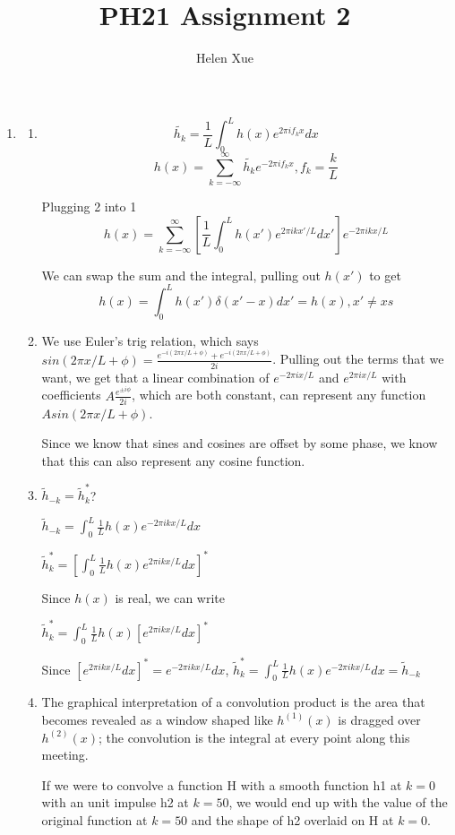 \documentclass[a4paper,11pt,english]{article}
\title{PH21 Assignment 2}
\author{Helen Xue}
\begin{document}
\maketitle

\begin{enumerate}
	\item 
	\begin{enumerate}
		\item $$\widetilde{h_k} = \frac{1}{L} \int_{0}^{L} h(x)e^{2\pi if_kx}dx$$ $$h(x) = \sum_{k=-\infty}^{\infty} \widetilde{h_k}e^{-2 \pi i f_kx}, f_k = \frac{k}{L}$$
		\par Plugging 2 into 1 
		$$h(x) = \sum_{k=-\infty}^{\infty} [ \frac{1}{L}\int_{0}^{L}h(x')e^{2\pi ikx'/L}dx']e^{-2 \pi i k x/L}$$
		\par We can swap the sum and the integral, pulling out $h(x')$ to get
		$$ h(x) = \int_0^L h(x') \delta(x'-x)dx' = h(x), x' \neq xs$$
		
		\item We use Euler's trig relation, which says $sin(2\pi x/L + \phi) = \frac{e^{-i(2\pi x/L + \phi)}+ e^{-i(2\pi x/L + \phi)}}{2i}$. Pulling out the terms that we want, we get that a linear combination of $e^{-2\pi i x/L}$ and $e^{2\pi i x/L}$ with coefficients $A\frac{e^{\pm i\phi}}{2i}$, which are both constant, can represent any function $Asin(2\pi x/L + \phi)$.
		
		 Since we know that sines and cosines are offset by some phase, we know that this can also represent any cosine function.
		
		\item $\widetilde h_{-k} = \widetilde h_k^*$?
		
		\par $\widetilde h_{-k} = \int_0^L \frac{1}{L} h(x)e^{-2\pi i kx/L}dx $  
		\par $\widetilde h_k^* = [\int_0^L \frac{1}{L} h(x)e^{2\pi i kx/L}dx ]^*$
		\par Since $h(x)$ is real, we can write
		\par $\widetilde h_k^* = \int_0^L \frac{1}{L} h(x)[e^{2\pi i kx/L}dx ]^*$
		\par Since $[e^{2\pi i kx/L}dx ]^* = e^{-2\pi i kx/L}dx $, $\widetilde h_k^* = \int_0^L \frac{1}{L} h(x)e^{-2\pi i kx/L}dx = \widetilde h_{-k} $
		
		\item The graphical interpretation of a convolution product is the area that becomes revealed as a window shaped like $h^{(1)}(x)$ is dragged over $h^{(2)}(x)$; the convolution is the integral at every point along this meeting.  
		\par If we were to convolve a function H with a smooth function h1 at $k=0$ with an unit impulse h2 at $k=50$, we would end up with the value of the original function at $k=50$ and the shape of h2 overlaid on H at $k=0$. 
		

\end{enumerate}
\end{enumerate}
\end{document}
